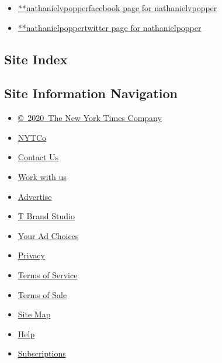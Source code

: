 \begin{itemize}
\tightlist
\item
  \href{https://www.facebook.com/nathanielvpopper}{**nathanielvpopperfacebook
  page for nathanielvpopper}
\item
  \href{https://twitter.com/nathanielpopper}{**nathanielpoppertwitter
  page for nathanielpopper}
\end{itemize}

\hypertarget{site-index}{%
\subsection{Site Index}\label{site-index}}

\hypertarget{site-information-navigation}{%
\subsection{Site Information
Navigation}\label{site-information-navigation}}

\begin{itemize}
\tightlist
\item
  \href{https://help.nytimes.com/hc/en-us/articles/115014792127-Copyright-notice}{©~2020~The
  New York Times Company}
\end{itemize}

\begin{itemize}
\tightlist
\item
  \href{https://www.nytco.com/}{NYTCo}
\item
  \href{https://help.nytimes.com/hc/en-us/articles/115015385887-Contact-Us}{Contact
  Us}
\item
  \href{https://www.nytco.com/careers/}{Work with us}
\item
  \href{https://nytmediakit.com/}{Advertise}
\item
  \href{http://www.tbrandstudio.com/}{T Brand Studio}
\item
  \href{https://www.nytimes.com/privacy/cookie-policy\#how-do-i-manage-trackers}{Your
  Ad Choices}
\item
  \href{https://www.nytimes.com/privacy}{Privacy}
\item
  \href{https://help.nytimes.com/hc/en-us/articles/115014893428-Terms-of-service}{Terms
  of Service}
\item
  \href{https://help.nytimes.com/hc/en-us/articles/115014893968-Terms-of-sale}{Terms
  of Sale}
\item
  \href{https://spiderbites.nytimes.com}{Site Map}
\item
  \href{https://help.nytimes.com/hc/en-us}{Help}
\item
  \href{https://www.nytimes.com/subscription?campaignId=37WXW}{Subscriptions}
\end{itemize}
